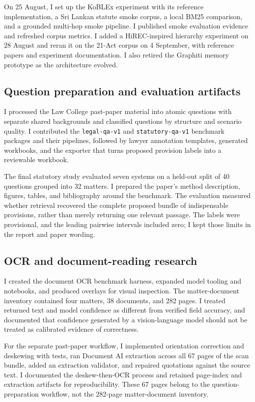 \documentclass[11pt,a4paper]{article}
\newcommand{\repo}[1]{\texttt{\nolinkurl{#1}}}
\begin{document}
On 25 August, I set up the KoBLEx experiment with its reference implementation, a Sri Lankan statute smoke corpus, a local BM25 comparison, and a grounded multi-hop smoke pipeline. I published smoke evaluation evidence and refreshed corpus metrics. I added a HiREC-inspired hierarchy experiment on 28 August and reran it on the 21-Act corpus on 4 September, with reference papers and experiment documentation. I also retired the Graphiti memory prototype as the architecture evolved.

\subsection{Question preparation and evaluation artifacts}
I processed the Law College past-paper material into atomic questions with separate shared backgrounds and classified questions by structure and scenario quality. I contributed the \repo{legal-qa-v1} and \repo{statutory-qa-v1} benchmark packages and their pipelines, followed by lawyer annotation templates, generated workbooks, and the exporter that turns proposed provision labels into a reviewable workbook.

The final statutory study evaluated seven systems on a held-out split of 40 questions grouped into 32 matters. I prepared the paper's method description, figures, tables, and bibliography around the benchmark. The evaluation measured whether retrieval recovered the complete proposed bundle of indispensable provisions, rather than merely returning one relevant passage. The labels were provisional, and the leading pairwise intervals included zero; I kept those limits in the report and paper wording.

\subsection{OCR and document-reading research}
I created the document OCR benchmark harness, expanded model tooling and notebooks, and produced overlays for visual inspection. The matter-document inventory contained four matters, 38 documents, and 282 pages. I treated returned text and model confidence as different from verified field accuracy, and documented that confidence generated by a vision-language model should not be treated as calibrated evidence of correctness.

For the separate past-paper workflow, I implemented orientation correction and deskewing with tests, ran Document AI extraction across all 67 pages of the scan bundle, added an extraction validator, and repaired quotations against the source text. I documented the deskew-then-OCR process and retained page-index and extraction artifacts for reproducibility. These 67 pages belong to the question-preparation workflow, not the 282-page matter-document inventory.
\end{document}
